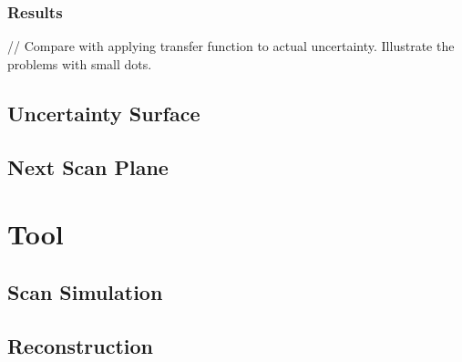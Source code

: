 \subsection*{Results}
// Compare with applying transfer function to actual uncertainty. Illustrate the problems with small dots.


\section{Uncertainty Surface}\label{section:uncertaintysurface}

\section{Next Scan Plane}\label{section:nextscanplane}

\chapter{Tool}

\section{Scan Simulation}\label{section:simulatescan}

\section{Reconstruction}\label{section:reconstruction}